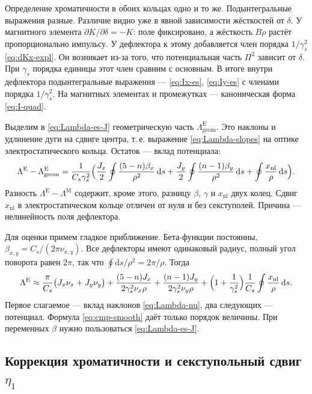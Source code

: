 Определение хроматичности в обоих кольцах одно и то же. Подынтегральные выражения разные. Различие видно уже в явной зависимости жёсткостей от $\delta$. У магнитного элемента $\partial K/\partial\delta=-K$: поле фиксировано, а жёсткость $B\rho$ растёт пропорционально импульсу. У дефлектора к этому добавляется член порядка $1/\gamma_s^2$ \eqref{eq:dKx-expl}. Он возникает из-за того, что потенциальная часть $\Pi^2$ зависит от $\delta$. При $\gamma_s$ порядка единицы этот член сравним с основным. В итоге внутри дефлектора подынтегральные выражения --- \eqref{eq:Ix-es}, \eqref{eq:Iy-es} с членами порядка $1/\gamma_s^2$. На магнитных элементах и промежутках --- каноническая форма \eqref{eq:I-quad}.

Выделим в \eqref{eq:Lambda-es-J} геометрическую часть $\Lambda^{\mathrm{E}}_{\mathrm{geom}}$. Это наклоны и удлинение дуги на сдвиге центра, т.\,е. выражение \eqref{eq:Lambda-slopes} на оптике электростатического кольца. Остаток --- вклад потенциала:
\begin{equation}
\label{eq:cmp-Lambda}
\Lambda^{\mathrm{E}}-\Lambda^{\mathrm{E}}_{\mathrm{geom}}
=\frac{1}{C_s\gamma_s^2}
\Bigl(
\frac{J_x}{2}\oint\frac{(5-n)\beta_x}{\rho^2}\,\mathrm{d}s
+\frac{J_y}{2}\oint\frac{(n-1)\beta_y}{\rho^2}\,\mathrm{d}s
+\oint\frac{x_{\mathrm{nl}}}{\rho}\,\mathrm{d}s
\Bigr).
\end{equation}
Разность $\Lambda^{\mathrm{E}}-\Lambda^{\mathrm{M}}$ содержит, кроме этого, разницу $\beta$, $\gamma$ и $x_{\mathrm{nl}}$ двух колец. Сдвиг $x_{\mathrm{nl}}$ в электростатическом кольце отличен от нуля и без секступолей. Причина --- нелинейность поля дефлектора.

Для оценки примем гладкое приближение. Бета-функции постоянны, $\beta_{x,y}=C_s/(2\pi\nu_{x,y})$. Все дефлекторы имеют одинаковый радиус, полный угол поворота равен $2\pi$, так что $\oint\mathrm{d}s/\rho^2=2\pi/\rho$. Тогда
\begin{equation}
\label{eq:cmp-smooth}
\Lambda^{\mathrm{E}}
\approx\frac{\pi}{C_s}\bigl(J_x\nu_x+J_y\nu_y\bigr)
+\frac{(5-n)J_x}{2\gamma_s^2\nu_x\rho}
+\frac{(n-1)J_y}{2\gamma_s^2\nu_y\rho}
+\Bigl(1+\frac{1}{\gamma_s^2}\Bigr)
\frac{1}{C_s}\oint\frac{x_{\mathrm{nl}}}{\rho}\,\mathrm{d}s.
\end{equation}
Первое слагаемое --- вклад наклонов \eqref{eq:Lambda-nu}, два следующих --- потенциал. Формула \eqref{eq:cmp-smooth} даёт только порядок величины. При переменных $\beta$ нужно пользоваться \eqref{eq:Lambda-es-J}.

\subsection{Коррекция хроматичности и секступольный сдвиг $\eta_1$}


